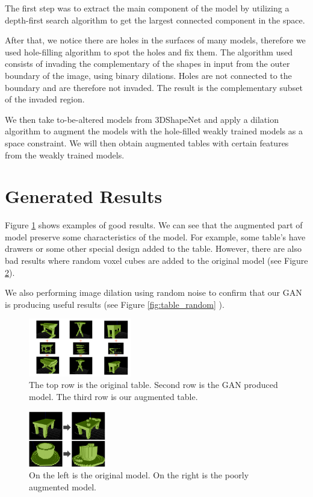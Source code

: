 \documentclass{sigchi}
\begin{document}
The first step was to extract the main component of the model by utilizing a depth-first search algorithm to get the largest connected component in the space.

After that, we notice there are holes in the surfaces of many models, therefore we used hole-filling algorithm to spot the holes and fix them. The algorithm used consists of invading the complementary of the shapes in input from the outer boundary of the image, using binary dilations. Holes are not connected to the boundary and are therefore not invaded. The result is the complementary subset of the invaded region.

We then take to-be-altered models from 3DShapeNet and apply a dilation algorithm to augment the models with the hole-filled weakly trained models as a space constraint. We will then obtain augmented tables with certain features from the weakly trained models.


\section{Generated Results}

Figure \ref{fig:table_results} shows examples of good results. We can see that the augmented part of model preserve some characteristics of the model. For example, some table’s have drawers or some other special design added to the table. However, there are also bad results where random voxel cubes are added to the original model (see Figure \ref{fig:bad_results}). 

We also performing image dilation using random noise to confirm that our GAN  is producing useful results (see Figure \ref{fig:table_random} ).

\begin{figure}
\includegraphics[width=0.4\textwidth]{figs/table_results.png}
\centering
\caption{The top row is the original table. Second row is the GAN produced model. The third row is our augmented table.}
\label{fig:table_results}
\end{figure}

\begin{figure}
\includegraphics[width=0.3\textwidth]{figs/bad_results.png}
\centering
\caption{On the left is the original model. On the right is the poorly augmented model.}
\label{fig:bad_results}
\end{figure}
\end{document}

